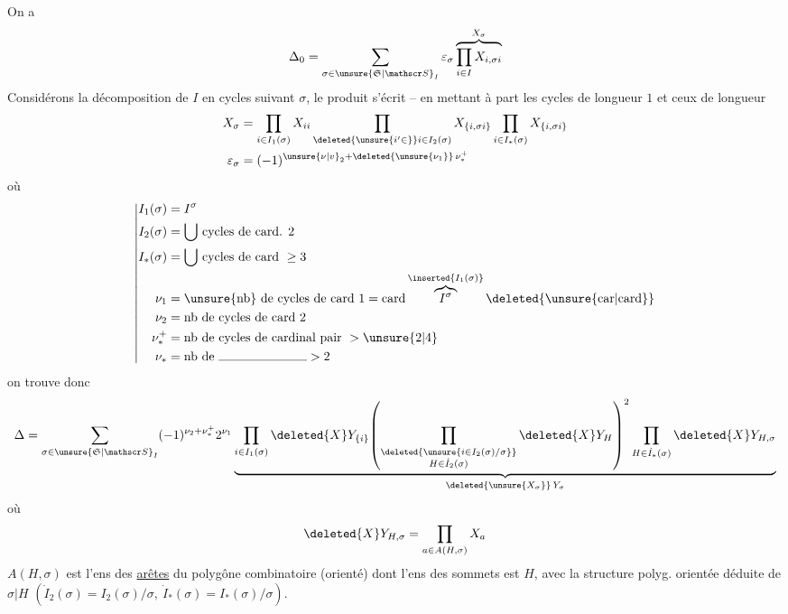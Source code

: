 On a
\[
\Delta_0=\sum_{\sigma\in\unsure{\mathfrak S|\mathscr S}_I}\varepsilon_\sigma
\overbrace{\prod_{i\in I}X_{i,\sigma i}}^{X_\sigma}
\]
Considérons la décomposition de $I$ en cycles suivant $\sigma$, le produit s'écrit -- en mettant à
part les cycles de longueur $1$ et ceux de longueur 
\[
\begin{aligned}
X_\sigma&=\prod_{i\in I_1(\sigma)}X_{ii}
\prod_{\deleted{\unsure{i'\in}}i\in I_2(\sigma)} X_{\{i,\sigma i\}}
\prod_{i\in I_*(\sigma)}X_{\{i,\sigma i\}}\\
\varepsilon_\sigma&=(-1)^{\unsure{\nu|v}_2+\deleted{\unsure{\nu_1}}\,\nu_*^+}
\end{aligned}
\]
où
\[
\left|\begin{aligned}
I_1(\sigma)&=I^\sigma\\
I_2(\sigma)&=\bigcup\,\text{cycles de card. }2\\
I_*(\sigma)&=\bigcup\,\text{cycles de card }\geq3\\
\nu_1&=\unsure{\text{nb}}\ \text{de cycles de card }1=\operatorname{card}\overbrace{I^\sigma}^{\inserted{I_1(\sigma)}}\deleted{\unsure{\mathrm{car}|\mathrm{card}}}\\
\nu_2&=\text{nb de cycles de card }2\\
\nu_*^+&=\text{nb de cycles de cardinal pair } >\unsure{2|4}\\
\nu_*&=\text{nb de }\rule{7em}{0.35pt}>2
\end{aligned}\right.
\]
on trouve donc
\[
\Delta=\sum_{\sigma\in\unsure{\mathfrak S|\mathscr S}_I}(-1)^{\nu_2+\nu_*^+}2^{\nu_1}
\underbrace{\prod_{i\in I_1(\sigma)}\deleted{X}Y_{\{i\}}\!
\left(\prod_{\substack{\deleted{\unsure{i\in I_2(\sigma)/\sigma}}\\H\in\dot I_2(\sigma)}}\deleted{X}Y_H\right)^{2}
\prod_{H\in\dot I_*(\sigma)}\deleted{X}Y_{H,\sigma}}_{\deleted{\unsure{X_\sigma}}\,Y_\sigma}
\]
où
\[
\deleted{X}Y_{H,\sigma}=\prod_{a\in A(H,\sigma)}X_a
\]
$A(H,\sigma)$ est l'ens des \uline{arêtes} du polygône combinatoire (orienté) dont l'ens des sommets est $H$, avec la structure polyg. orientée déduite de $\sigma|H$ \enspace $(\dot I_2(\sigma)=I_2(\sigma)/\sigma,\ \dot I_*(\sigma)=I_*(\sigma)/\sigma)$.


